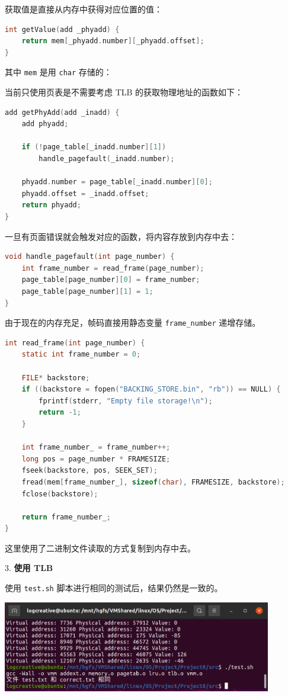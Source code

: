 \documentclass[12pt,a4paper]{article}
\newenvironment{problems}{\begin{list}{}{\renewcommand{\makelabel}[1]{\textbf{##1}\hfil}}}{\end{list}}
\providecommand{\code}[2]{}
\begin{document}
\begin{problems}
    获取值是直接从内存中获得对应位置的值：
    \begin{lstlisting}[language=c]
int getValue(add _phyadd) {
    return mem[_phyadd.number][_phyadd.offset];
}
    \end{lstlisting}

    其中 \verb"mem" 是用 \verb"char" 存储的：
    \code{src/memory.h}{c}

    当前只使用页表是不需要考虑 TLB 的获取物理地址的函数如下：
    \begin{lstlisting}[language=c]
add getPhyAdd(add _inadd) {
    add phyadd;

    if (!page_table[_inadd.number][1])
        handle_pagefault(_inadd.number);

    phyadd.number = page_table[_inadd.number][0];
    phyadd.offset = _inadd.offset;
    return phyadd;
}
    \end{lstlisting}

    一旦有页面错误就会触发对应的函数，将内容存放到内存中去：
    \begin{lstlisting}[language=c]
void handle_pagefault(int page_number) {
	int frame_number = read_frame(page_number);
	page_table[page_number][0] = frame_number;
	page_table[page_number][1] = 1;
}
    \end{lstlisting}

    由于现在的内存充足，帧码直接用静态变量 \verb"frame_number" 递增存储。
    \begin{lstlisting}[language=c]
int read_frame(int page_number) {
	static int frame_number = 0;

	FILE* backstore;
	if ((backstore = fopen("BACKING_STORE.bin", "rb")) == NULL) {
		fprintf(stderr, "Empty file storage!\n");
		return -1;
	}

	int frame_number_ = frame_number++;
	long pos = page_number * FRAMESIZE;
	fseek(backstore, pos, SEEK_SET);
	fread(mem[frame_number_], sizeof(char), FRAMESIZE, backstore);
	fclose(backstore);

	return frame_number_;
}
    \end{lstlisting}
    这里使用了二进制文件读取的方式复制到内存中去。

    \item[3.] \textbf{使用 TLB}
    
    使用 \verb"test.sh" 脚本进行相同的测试后，结果仍然是一致的。
    \code{src/test.sh}{}
    
    \includegraphics[width=0.88\textwidth]{tlb.png}


\end{problems}
\end{document}
